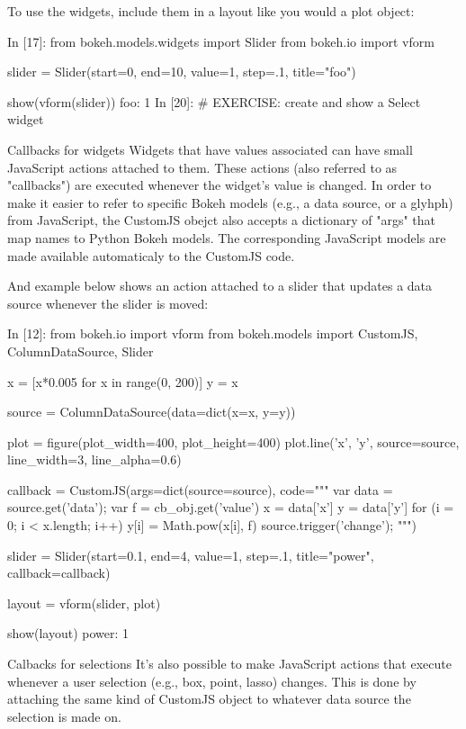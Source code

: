 To use the widgets, include them in a layout like you would a plot object:

In [17]:
from bokeh.models.widgets import Slider
from bokeh.io import vform

slider = Slider(start=0, end=10, value=1, step=.1, title="foo")

show(vform(slider))
foo:  
1
In [20]:
# EXERCISE: create and show a Select widget 

Callbacks for widgets
Widgets that have values associated can have small JavaScript actions attached to them. These actions (also referred to as "callbacks") are executed whenever the widget's value is changed. In order to make it easier to refer to specific Bokeh models (e.g., a data source, or a glyhph) from JavaScript, the CustomJS obejct also accepts a dictionary of "args" that map names to Python Bokeh models. The corresponding JavaScript models are made available automaticaly to the CustomJS code.

And example below shows an action attached to a slider that updates a data source whenever the slider is moved:

In [12]:
from bokeh.io import vform
from bokeh.models import CustomJS, ColumnDataSource, Slider

x = [x*0.005 for x in range(0, 200)]
y = x

source = ColumnDataSource(data=dict(x=x, y=y))

plot = figure(plot_width=400, plot_height=400)
plot.line('x', 'y', source=source, line_width=3, line_alpha=0.6)

callback = CustomJS(args=dict(source=source), code="""
    var data = source.get('data');
    var f = cb_obj.get('value')
    x = data['x']
    y = data['y']
    for (i = 0; i < x.length; i++) {
        y[i] = Math.pow(x[i], f)
    }
    source.trigger('change');
""")

slider = Slider(start=0.1, end=4, value=1, step=.1, title="power", callback=callback)

layout = vform(slider, plot)

show(layout)
power:  
1
 	

Calbacks for selections
It's also possible to make JavaScript actions that execute whenever a user selection (e.g., box, point, lasso) changes. This is done by attaching the same kind of CustomJS object to whatever data source the selection is made on.

